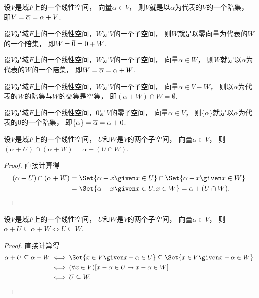 \begin{proposition}
设\(V\)是域\(F\)上的一个线性空间，
向量\(\alpha \in V\)，
则\(V\)就是以\(\alpha\)为代表的\(V\)的一个陪集，
即\(
	V
	= \EquivalenceClassO{\alpha}
	= \alpha + V
\).
\end{proposition}

\begin{proposition}
设\(V\)是域\(F\)上的一个线性空间，\(W\)是\(V\)的一个子空间，
则\(W\)就是以零向量为代表的\(W\)的一个陪集，
即\(
	W
	= \EquivalenceClassO{0}
	= 0 + W
\).
\end{proposition}

\begin{proposition}
设\(V\)是域\(F\)上的一个线性空间，\(W\)是\(V\)的一个子空间，
向量\(\alpha \in W\)，
则\(W\)就是以\(\alpha\)为代表的\(W\)的一个陪集，
即\(
	W
	= \EquivalenceClassO{\alpha}
	= \alpha + W
\).
\end{proposition}

\begin{proposition}
设\(V\)是域\(F\)上的一个线性空间，\(W\)是\(V\)的一个子空间，
向量\(\alpha \in V - W\)，
则以\(\alpha\)为代表的\(W\)的陪集与\(W\)的交集是空集，
即\(
	(\alpha + W) \cap W = \emptyset
\).
\end{proposition}

\begin{proposition}
设\(V\)是域\(F\)上的一个线性空间，\(0\)是\(V\)的零子空间，
向量\(\alpha \in V\)，
则\(\{\alpha\}\)就是以\(\alpha\)为代表的\(0\)的一个陪集，
即\(
	\{\alpha\}
	= \EquivalenceClassO{\alpha}
	= \alpha + 0
\).
\end{proposition}

\begin{proposition}
设\(V\)是域\(F\)上的一个线性空间，
\(U\)和\(W\)是\(V\)的两个子空间，
向量\(\alpha \in V\)，
则\((\alpha + U) \cap (\alpha + W) = \alpha + (U \cap W)\).
\begin{proof}
直接计算得\begin{align*}
	(\alpha + U) \cap (\alpha + W)
	&= \Set{ \alpha + x \given x \in U } \cap \Set{ \alpha + x \given x \in W } \\
	&= \Set{ \alpha + x \given x \in U, x \in W }
	= \alpha + (U \cap W).
	\qedhere
\end{align*}
\end{proof}
\end{proposition}

\begin{proposition}
设\(V\)是域\(F\)上的一个线性空间，
\(U\)和\(W\)是\(V\)的两个子空间，
向量\(\alpha \in V\)，
则\(
	\alpha + U \subseteq \alpha + W
	\iff
	U \subseteq W
\).
\begin{proof}
直接计算得\begin{align*}
	\alpha + U \subseteq \alpha + W
	&\iff \Set{ x \in V \given x - \alpha \in U } \subseteq \Set{ x \in V \given x - \alpha \in W } \\
	&\iff (\forall x \in V)[x - \alpha \in U \limp x - \alpha \in W] \\
	&\iff U \subseteq W.
	\qedhere
\end{align*}
\end{proof}
\end{proposition}

